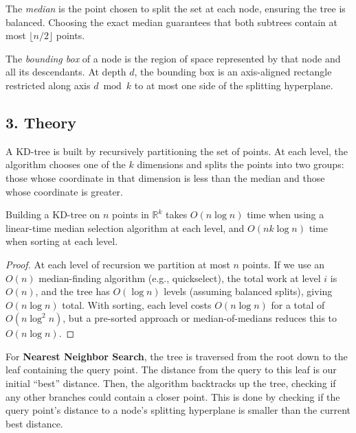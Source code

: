 \begin{definition}
\label{def:kd_median}
The \emph{median} is the point chosen to split the set at each node, ensuring the tree is balanced. Choosing the exact median guarantees that both subtrees contain at most $\lfloor n/2 \rfloor$ points.
\end{definition}

\begin{definition}
\label{def:kd_bounding_box}
The \emph{bounding box} of a node is the region of space represented by that node and all its descendants. At depth $d$, the bounding box is an axis-aligned rectangle restricted along axis $d \bmod k$ to at most one side of the splitting hyperplane.
\end{definition}

\subsection{3. Theory}
A KD-tree is built by recursively partitioning the set of points. At each level, the algorithm chooses one of the $k$ dimensions and splits the points into two groups: those whose coordinate in that dimension is less than the median and those whose coordinate is greater.

\begin{theorem}
\label{thm:kd_build_complexity}
Building a KD-tree on $n$ points in $\mathbb{R}^k$ takes $O(n \log n)$ time when using a linear-time median selection algorithm at each level, and $O(n k \log n)$ time when sorting at each level.
\end{theorem}
\begin{proof}
At each level of recursion we partition at most $n$ points. If we use an $O(n)$ median-finding algorithm (e.g., quickselect), the total work at level $i$ is $O(n)$, and the tree has $O(\log n)$ levels (assuming balanced splits), giving $O(n \log n)$ total. With sorting, each level costs $O(n \log n)$ for a total of $O(n \log^2 n)$, but a pre-sorted approach or median-of-medians reduces this to $O(n \log n)$.
\end{proof}

For \textbf{Nearest Neighbor Search}, the tree is traversed from the root down to the leaf containing the query point. The distance from the query to this leaf is our initial ``best'' distance. Then, the algorithm backtracks up the tree, checking if any other branches could contain a closer point. This is done by checking if the query point's distance to a node's splitting hyperplane is smaller than the current best distance.

